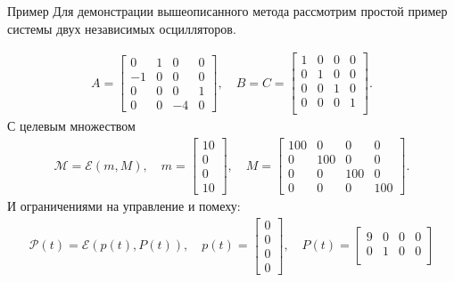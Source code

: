 \begin{section}{Пример}
Для демонстрации вышеописанного метода рассмотрим простой пример системы двух независимых осцилляторов.

\begin{gather*}
    A = \begin{bmatrix}
        0 & 1 & 0 & 0 \\[0.3em]
        -1 & 0 & 0 & 0 \\[0.3em]
        0 & 0 & 0 & 1 \\[0.3em]
        0 & 0 & -4 & 0 
    \end{bmatrix}, \quad
    B = C = \begin{bmatrix}
        1 & 0 & 0 & 0 \\[0.3em]
        0 & 1 & 0 & 0 \\[0.3em]
        0 & 0 & 1 & 0 \\[0.3em]
        0 & 0 & 0 & 1 \\[0.3em]
    \end{bmatrix}.
\end{gather*}
С целевым множеством 
\begin{gather*}
    \mathcal{M} = \mathcal{E}(m, M), \quad
    m = \begin{bmatrix}
        10 \\[0.3em]
        0 \\[0.3em]
        0 \\[0.3em]
        10
    \end{bmatrix}, \quad
    M = \begin{bmatrix}
        100 & 0 & 0 & 0 \\[0.3em]
        0 & 100 & 0 & 0 \\[0.3em]
        0 & 0 & 100 & 0 \\[0.3em]
        0 & 0 & 0 & 100
    \end{bmatrix}.
\end{gather*}
И ограничениями на управление и помеху:
\begin{gather*}
    \mathcal{P}(t) = \mathcal{E}(p(t), P(t)), \quad
    p(t) = \begin{bmatrix}
        0 \\[0.3em]
        0 \\[0.3em]
        0 \\[0.3em]
        0
    \end{bmatrix}, \quad
    P(t) = \begin{bmatrix}
        9 & 0 & 0 & 0 \\[0.3em]
        0 & 1 & 0 & 0 \\[0.3em]

\end{bmatrix}
\end{gather*}
\end{section}
